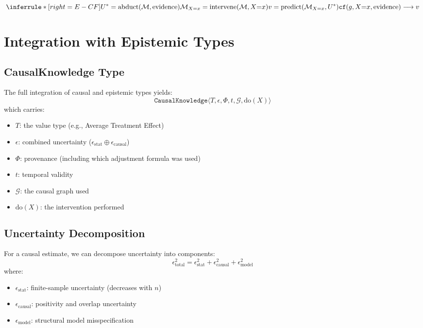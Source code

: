 \documentclass[11pt]{article}
\begin{document}
\[
\inferrule*[right=E-CF]
  {U^* = \text{abduct}(\mathcal{M}, \text{evidence}) \\
   \mathcal{M}_{X=x} = \text{intervene}(\mathcal{M}, X{=}x) \\
   v = \text{predict}(\mathcal{M}_{X=x}, U^*)}
  {\texttt{cf}(g, X{=}x, \text{evidence}) \longrightarrow v}
\]

\section{Integration with Epistemic Types}

\subsection{CausalKnowledge Type}
The full integration of causal and epistemic types yields:
\[
\texttt{CausalKnowledge}\langle T, \epsilon, \Phi, t, \mathcal{G}, \text{do}(X) \rangle
\]
which carries:
\begin{itemize}
\item $T$: the value type (e.g., Average Treatment Effect)
\item $\epsilon$: combined uncertainty ($\epsilon_{\text{stat}} \oplus \epsilon_{\text{causal}}$)
\item $\Phi$: provenance (including which adjustment formula was used)
\item $t$: temporal validity
\item $\mathcal{G}$: the causal graph used
\item $\text{do}(X)$: the intervention performed
\end{itemize}

\subsection{Uncertainty Decomposition}
For a causal estimate, we can decompose uncertainty into components:
\[
\epsilon_{\text{total}}^2 = \epsilon_{\text{stat}}^2 + \epsilon_{\text{causal}}^2 + \epsilon_{\text{model}}^2
\]
where:
\begin{itemize}
\item $\epsilon_{\text{stat}}$: finite-sample uncertainty (decreases with $n$)
\item $\epsilon_{\text{causal}}$: positivity and overlap uncertainty
\item $\epsilon_{\text{model}}$: structural model misspecification
\end{itemize}
\end{document}

